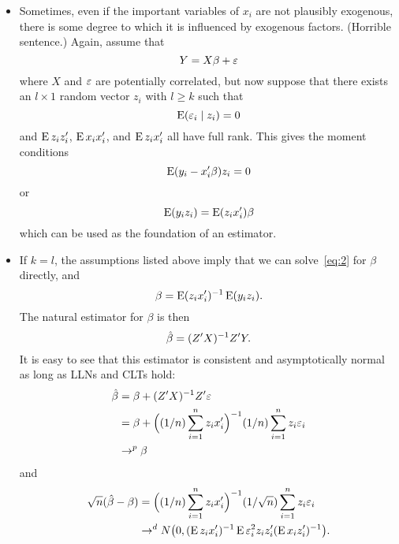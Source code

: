 \begin{itemize}[leftmargin=0pt]

\item Sometimes, even if the important variables of $x_i$ are not
  plausibly exogenous, there is some degree to which it is influenced
  by exogenous factors. (Horrible sentence.) Again, assume that
  \begin{equation*}
    Y = X\beta + \varepsilon
  \end{equation*}
  where $X$ and $\varepsilon$ are potentially correlated, but now suppose
  that there exists an $l \times 1$ random vector $z_i$ with $l \geq
  k$ such that
  \begin{equation*}
    \operatorname{E}(\varepsilon_i \mid z_i) = 0
  \end{equation*}
  and $\operatorname{E} z_i z_i'$, $\operatorname{E} x_i x_i'$, and $\operatorname{E} z_i x_i'$ all have full
  rank. This gives the moment conditions
  \begin{equation*}
    \operatorname{E} (y_i - x_i'\beta) z_i = 0
  \end{equation*}
  or
  \begin{equation}\label{eq:2}
    \operatorname{E} (y_i z_i) = \operatorname{E} (z_i x_i')\beta
  \end{equation}
  which can be used as the foundation of an estimator.

\item If $k = l$, the assumptions listed above imply that we can
  solve~\eqref{eq:2} for $\beta$ directly, and
  \begin{equation*}
    \beta = \operatorname{E} (z_i x_i')^{-1} \operatorname{E} (y_i z_i).
  \end{equation*}
  The natural estimator for $\beta$ is then
  \begin{equation*}
    \hat{\beta} = (Z'X)^{-1} Z'Y.
  \end{equation*}
  It is easy to see that this estimator is consistent and
  asymptotically normal as long as LLNs and CLTs hold:
  \begin{align*}
    \hat{\beta}
    &= \beta + (Z'X)^{-1}Z'\varepsilon \\
    &= \beta + \Big((1/n) \sum_{i=1}^n z_i x_i'\Big)^{-1}
    (1/n) \sum_{i=1}^n z_i \varepsilon_i \\
    &\to^p \beta
  \end{align*}
  and
  \begin{align*}
    \sqrt{n}(\hat{\beta} - \beta)
    &= \Big((1/n) \sum_{i=1}^n z_i x_i'\Big)^{-1}
    (1/\sqrt{n}) \sum_{i=1}^n z_i \varepsilon_i \\
    &\to^d N\big(0, (\operatorname{E} z_i x_i')^{-1} \operatorname{E} \varepsilon_i^2 z_i z_i' (\operatorname{E} x_i z_i')^{-1}\big).
  \end{align*}


\end{itemize}
